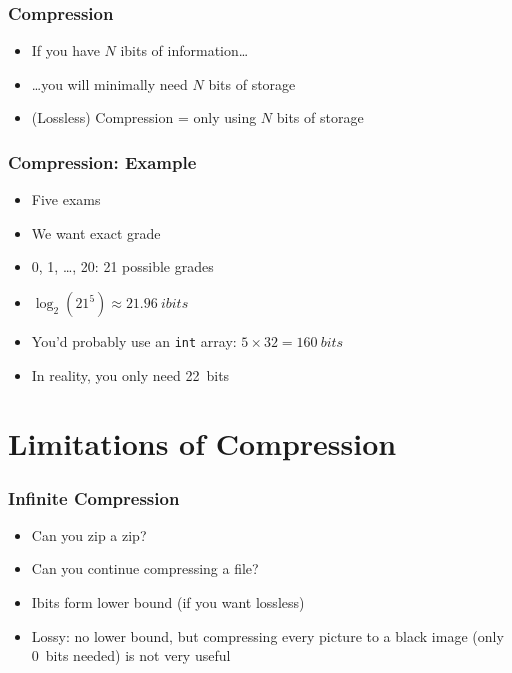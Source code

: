\begin{frame}
  \frametitle{Compression}
  \begin{itemize}
    \item If you have $N$ ibits of information\dots
    \item \dots you will minimally need $N$ bits of storage
    \item (Lossless) Compression = only using $N$ bits of storage
  \end{itemize}
\end{frame}

\begin{frame}
  \frametitle{Compression: Example}
  \begin{itemize}
    \item Five exams
    \item We want exact grade
    \item 0, 1, \dots, 20: 21 possible grades
    \item $\log_2(21^5) \approx \SI{21.96}{ibits}$
    \item You'd probably use an {\tt int} array: $5 \times 32 = \SI{160}{bits}$
    \item In reality, you only need \SI{22}{bits}
  \end{itemize}
\end{frame}

\section{Limitations of Compression}

\begin{frame}
  \tableofcontents[currentsection]
\end{frame}

\begin{frame}
  \frametitle{Infinite Compression}
  \begin{itemize}
    \item Can you zip a zip?
    \item Can you continue compressing a file?
    \item Ibits form lower bound (if you want lossless)
    \item Lossy: no lower bound, but compressing every picture to a black image (only \SI{0}{bits} needed) is not very useful
  \end{itemize}
\end{frame}


